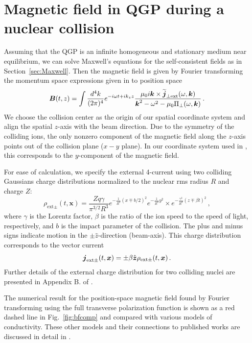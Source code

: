 \section{Magnetic field in QGP during a nuclear collision}\label{sec:Maxwell2}
Assuming that the QGP is an infinite homogeneous and stationary medium near equilibrium, we can solve Maxwell's equations for the self-consistent fields as in Section~\ref{sec:Maxwell}. Then the magnetic field is given by Fourier transforming the momentum space expressions given in  to position space
\begin{equation}\label{eq:magorgin}
   \boldsymbol{B}(t, z) = \int \frac{d^4k}{(2\pi)^4}  e^{-i\omega t+ik_z z}
 \frac{\mu_0 i \boldsymbol{k} \times\widetilde{\boldsymbol{j}}_{\perp \text{ext}}(\omega, \boldsymbol{k})}{\boldsymbol{k}^2 - \omega^2 - \mu_0 \Pi_{\perp}(\omega, \boldsymbol{k})}\,.
\end{equation}
We choose the collision center as the origin of our spatial coordinate system and align the spatial $z$-axis with the beam direction. Due to the symmetry of the colliding ions, the only nonzero component of the magnetic field along the $z$-axis points out of the collision plane ($x-y$ plane). In our coordinate system used in \cite{Grayson:2022asf}, this corresponds to the $y$-component of the magnetic field. 

For ease of calculation, we specify the external 4-current using two colliding Gaussians charge distributions normalized to the nuclear rms radius $R$ and charge $Z$:
\begin{equation}\label{eq:rhoext}
\rho_{\text{ext}\pm }(t,\boldsymbol{x}) = \frac{Zq\gamma}{\pi^{3/2}R^3}e^{-\frac{1}{R^2}(x\mp b/2)^2}e^{-\frac{1}{R^2}y^2}
\times e^{-\frac{\gamma^2}{R^2}(z\mp \beta t)^2}\,,
\end{equation}
where $\gamma$ is the Lorentz factor, $\beta$ is the ratio of the ion speed to the speed of light, respectively, and $b$ is the impact parameter of the collision. The plus and minus signs indicate motion in the $\pm \hat{z}$-direction (beam-axis). This charge distribution corresponds to the vector current
\begin{equation}\label{eq:jext}
\boldsymbol{j}_{\text{ext}\pm}(t, \boldsymbol{x}) = \pm \beta \hat{\boldsymbol{z}} \rho_{\text{ext}\pm}(t, \boldsymbol{x})\,.
\end{equation}
Further details of the external charge distribution for two colliding nuclei are presented in Appendix B. of \cite{Grayson:2022asf}.

The numerical result for the position-space magnetic field found by Fourier transforming  using the full transverse polarization function  is shown as a red dashed line in Fig.~\ref{fig:bfcomp} and compared with various models of conductivity. These other models and their connections to published works are discussed in detail in \cite{Grayson:2022asf}.

